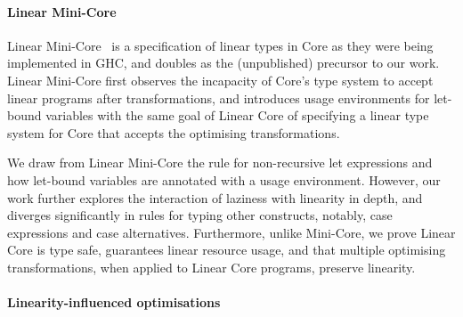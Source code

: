 \documentclass[acmsmall,review,anonymous,screen]{acmart}
\begin{document}
\paragraph{Linear Mini-Core\label{sec:linear-mini-core}}

Linear Mini-Core~\cite{cite:minicore} is a specification of linear types in
Core as they were being implemented in GHC, and doubles as the (unpublished)
precursor to our work. Linear Mini-Core first observes the incapacity of
Core's type system to accept linear programs after transformations, and 
introduces usage environments for let-bound variables with the same goal of
Linear Core of specifying a linear type system for Core that accepts the
optimising transformations.

We draw from Linear Mini-Core the rule for non-recursive let expressions and
how let-bound variables are annotated with a usage environment. However, our
work further explores the interaction of laziness with linearity in depth, and
diverges significantly in rules for typing other constructs, notably, case expressions and
case alternatives. Furthermore, unlike Mini-Core, we prove Linear Core is type
safe, guarantees linear resource usage, and that multiple optimising
transformations, when applied to Linear Core programs, preserve linearity.

% 
% 

% 

\paragraph{Linearity-influenced optimisations}
\end{document}
